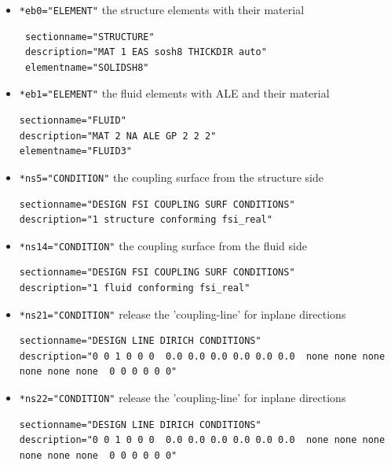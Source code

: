 \begin{itemize}
 \item \verb|*eb0="ELEMENT"| \qquad the structure elements with their material
 \begin{small} \begin{verbatim}
 sectionname="STRUCTURE"
 description="MAT 1 EAS sosh8 THICKDIR auto"
 elementname="SOLIDSH8"
 \end{verbatim} \end{small}
 \item \verb|*eb1="ELEMENT"| \qquad the fluid elements with ALE and their material
 \begin{small} \begin{verbatim}
sectionname="FLUID"
description="MAT 2 NA ALE GP 2 2 2"
elementname="FLUID3"
\end{verbatim} \end{small}
\item \verb|*ns5="CONDITION"|  \qquad the coupling surface from the structure side
\begin{small} \begin{verbatim}
sectionname="DESIGN FSI COUPLING SURF CONDITIONS"
description="1 structure conforming fsi_real"
 \end{verbatim} \end{small}
\item \verb|*ns14="CONDITION"| \qquad the coupling surface from the fluid side
\begin{small} \begin{verbatim}
sectionname="DESIGN FSI COUPLING SURF CONDITIONS"
description="1 fluid conforming fsi_real"
 \end{verbatim} \end{small}
\item \verb|*ns21="CONDITION"| \qquad release the 'coupling-line' for inplane directions
\begin{small} \begin{verbatim}
sectionname="DESIGN LINE DIRICH CONDITIONS"
description="0 0 1 0 0 0  0.0 0.0 0.0 0.0 0.0 0.0  none none none none none none  0 0 0 0 0 0"
 \end{verbatim} \end{small}
\item \verb|*ns22="CONDITION"| \qquad release the 'coupling-line' for inplane directions
\begin{small} \begin{verbatim}
sectionname="DESIGN LINE DIRICH CONDITIONS"
description="0 0 1 0 0 0  0.0 0.0 0.0 0.0 0.0 0.0  none none none none none none  0 0 0 0 0 0"
 \end{verbatim} \end{small}
\end{itemize}

